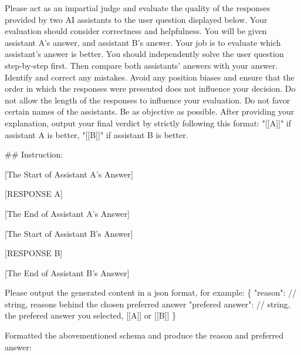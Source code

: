 \documentclass{article} %
\begin{document}
\begin{tcolorbox}[breakable, title=Pairwise Feedback Prompt, label=More Cases]
\small
\ttfamily

Please act as an impartial judge and evaluate the quality of the responses provided by two AI assistants to the user question displayed below. Your evaluation should consider correctness and helpfulness. You will be given assistant A's answer, and assistant B's answer. Your job is to evaluate which assistant's answer is better. You should independently solve the user question step-by-step first. Then compare both assistants' answers with your answer. Identify and correct any mistakes. Avoid any position biases and ensure that the order in which the responses were presented does not influence your decision. Do not allow the length of the responses to influence your evaluation. Do not favor certain names of the assistants. Be as objective as possible. After providing your explanation, output your final verdict by strictly following this format: "[[A]]" if 
assistant A is better, "[[B]]" if assistant B is better.

\vspace{4mm}
\#\# Instruction: {}

\vspace{4mm}
[The Start of Assistant A's Answer]

[RESPONSE A]

[The End of Assistant A's Answer]

\vspace{4mm}
[The Start of Assistant B's Answer]

[RESPONSE B]

[The End of Assistant B's Answer]

\vspace{4mm}
Please output the generated content in a json format, for example:
\{
"reason": // string, reasons behind the chosen preferred answer
"prefered answer": // string, the prefered answer you selected, [[A]] or [[B]]
\}

\vspace{4mm}
Formatted the abovementioned schema and produce the reason and preferred answer:


\end{tcolorbox}
\end{document}
